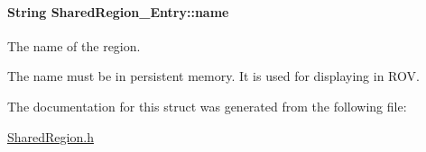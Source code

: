\paragraph[{name}]{\setlength{\rightskip}{0pt plus 5cm}String Shared\-Region\-\_\-\-Entry\-::name}\label{struct_shared_region___entry_a1e87b924f55373c770d8d5add58b9267}
The name of the region. \begin{DoxyVerb}   The name must be in persistent memory.  It is used for
   displaying in ROV.\end{DoxyVerb}
 

The documentation for this struct was generated from the following file\-:\begin{DoxyCompactItemize}
\item 
\hyperlink{_shared_region_8h}{Shared\-Region.\-h}\end{DoxyCompactItemize}
